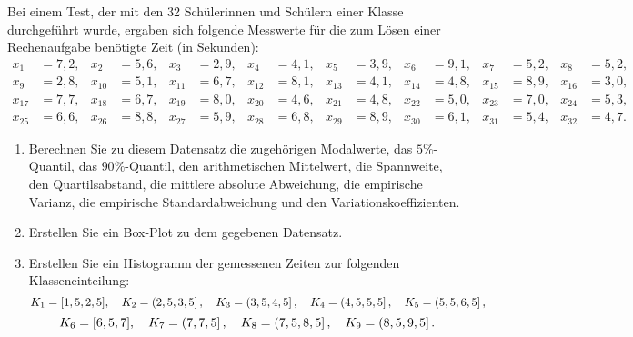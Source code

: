 \documentclass{exercise}
\begin{document}
    \begin{problem}
        Bei einem Test, der mit den 32 Schülerinnen und Schülern einer Klasse durchgeführt wurde, ergaben sich folgende Messwerte für die zum Lösen einer Rechenaufgabe benötigte Zeit (in Sekunden):
        \begin{align*}
            x_1 &= 7,2, & x_2 &= 5,6, & x_3 &= 2,9, & x_4 &= 4,1, & x_5 &= 3,9, & x_6 &= 9,1, & x_7 &= 5,2, & x_8 &= 5,2,\\
            x_9 &= 2,8, & x_{10} &= 5,1, & x_{11} &= 6,7, & x_{12} &= 8,1, & x_{13} &= 4,1, & x_{14} &= 4,8, & x_{15} &= 8,9, & x_{16} &= 3,0,\\
            x_{17} &= 7,7, & x_{18} &= 6,7, & x_{19} &= 8,0, & x_{20} &= 4,6, & x_{21} &= 4,8, & x_{22} &= 5,0, & x_{23} &= 7,0, & x_{24} &= 5,3,\\
            x_{25} &= 6,6, & x_{26} &= 8,8, & x_{27} &= 5,9, & x_{28} &= 6,8, & x_{29} &= 8,9, & x_{30} &= 6,1, & x_{31} &= 5,4, & x_{32} &= 4,7.
        \end{align*}
        \begin{enumerate}
            \item Berechnen Sie zu diesem Datensatz die zugehörigen Modalwerte, das \(5\%\)-Quantil, das \(90\%\)-Quantil, den arithmetischen Mittelwert, die Spannweite, den Quartilsabstand, die mittlere absolute Abweichung, die empirische Varianz, die empirische Standardabweichung und den Variationskoeffizienten.
            \item Erstellen Sie ein Box-Plot zu dem gegebenen Datensatz.
            \item Erstellen Sie ein Histogramm der gemessenen Zeiten zur folgenden Klasseneinteilung:
            \[
                K_1 = \brackets*{1,5, 2,5}, \quad K_2 = \left(2,5, 3,5\right], \quad K_3 = \left(3,5, 4,5\right], \quad K_4 = \left(4,5, 5,5\right], \quad K_5 = \left(5,5, 6,5\right],
            \]
            \[
                K_6 = \brackets*{6,5, 7}, \quad K_7 = \left(7, 7,5\right], \quad K_8 = \left(7,5, 8,5\right], \quad K_9 = \left(8,5, 9,5\right].
            \]
        \end{enumerate}
    \end{problem}
\end{document}
